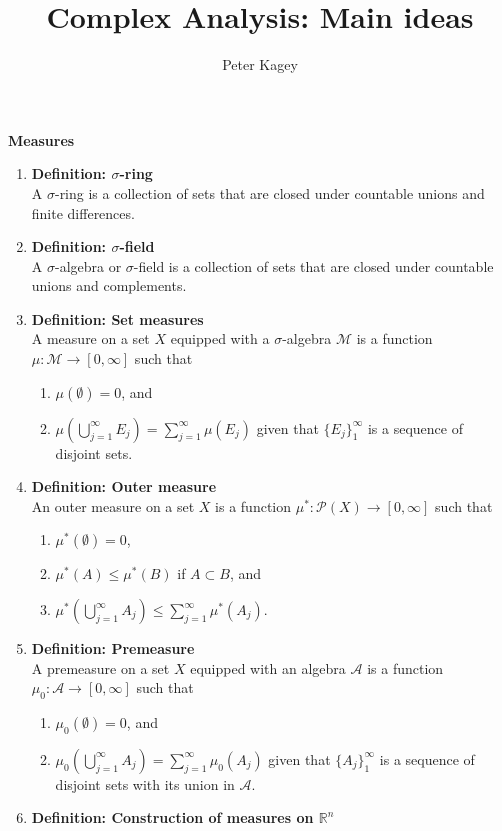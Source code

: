 \documentclass{article}
\begin{document}
\title{Complex Analysis: Main ideas}
\author{Peter Kagey}

\maketitle

\textbf{Measures}
\begin{enumerate}
  \item \textbf{Definition: $\sigma$-ring}\\
    A $\sigma$-ring is a collection of sets that are closed under countable
    unions and finite differences.
  \item \textbf{Definition: $\sigma$-field}\\
    A $\sigma$-algebra or $\sigma$-field is a collection of sets that are closed under countable
    unions and complements.
  \item \textbf{Definition: Set measures}\\
    A measure on a set $X$ equipped with a $\sigma$-algebra $\mathcal{M}$ is a
    function $\mu\colon \mathcal{M} \rightarrow [0, \infty]$ such that \begin{enumerate}
      \item $\mu(\emptyset) = 0$, and
      \item $\mu\left(\bigcup_{j=1}^\infty E_j\right) = \sum_{j=1}^\infty \mu(E_j)$
        given that $\{E_j\}_1^\infty$ is a sequence of disjoint sets.
    \end{enumerate}
  \item \textbf{Definition: Outer measure}\\
    An outer measure on a set $X$ is a function $\mu^*\colon \mathcal{P}(X) \rightarrow [0, \infty]$ such that \begin{enumerate}
      \item $\mu^*(\emptyset) = 0$,
      \item $\mu^*(A) \leq \mu^*(B)$ if $A \subset B$, and
      \item $\mu^*\mathopen{}\left(\bigcup_{j=1}^\infty A_j\mathclose{}\right) \leq \sum_{j=1}^\infty \mu^*(A_j)$.
    \end{enumerate}
  \item \textbf{Definition: Premeasure}\\
    A premeasure on a set $X$ equipped with an algebra $\mathcal{A}$ is a
    function $\mu_0\colon \mathcal{A} \rightarrow [0, \infty]$ such that \begin{enumerate}
      \item $\mu_0(\emptyset) = 0$, and
      \item $\mu_0\left(\bigcup_{j=1}^\infty A_j\right) = \sum_{j=1}^\infty \mu_0(A_j)$
        given that $\{A_j\}_1^\infty$ is a sequence of disjoint sets with its
        union in $\mathcal A$.
    \end{enumerate}
  \item \textbf{Definition: Construction of measures on $\mathbb{R}^n$}\\


\end{enumerate}
\end{document}
